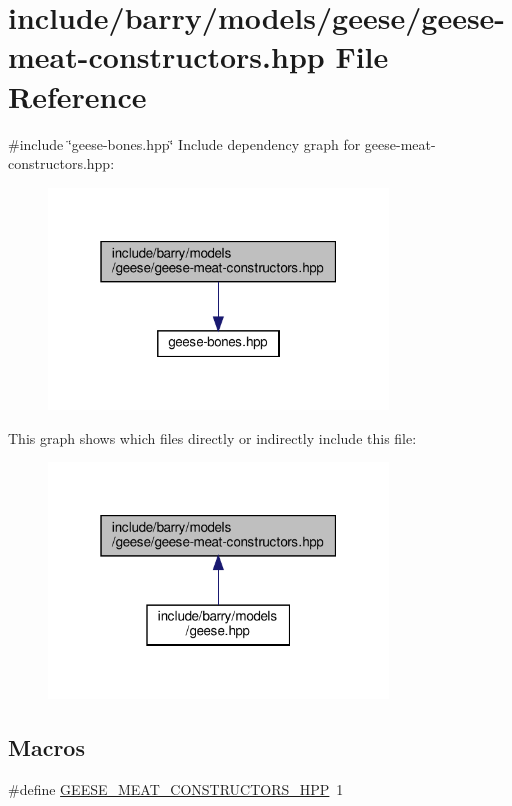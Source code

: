 \hypertarget{geese-meat-constructors_8hpp}{}\section{include/barry/models/geese/geese-\/meat-\/constructors.hpp File Reference}
\label{geese-meat-constructors_8hpp}
{\ttfamily \#include \char`\"{}geese-\/bones.\+hpp\char`\"{}}\newline
Include dependency graph for geese-\/meat-\/constructors.hpp\+:\nopagebreak
\begin{figure}[H]
\begin{center}
\leavevmode
\includegraphics[width=256pt]{geese-meat-constructors_8hpp__incl}
\end{center}
\end{figure}
This graph shows which files directly or indirectly include this file\+:\nopagebreak
\begin{figure}[H]
\begin{center}
\leavevmode
\includegraphics[width=256pt]{geese-meat-constructors_8hpp__dep__incl}
\end{center}
\end{figure}
\subsection*{Macros}
\begin{DoxyCompactItemize}
\item 
\#define \hyperlink{geese-meat-constructors_8hpp_a95bcd4c1ebfec95819701b9831eca55e}{G\+E\+E\+S\+E\+\_\+\+M\+E\+A\+T\+\_\+\+C\+O\+N\+S\+T\+R\+U\+C\+T\+O\+R\+S\+\_\+\+H\+PP}~1
\end{DoxyCompactItemize}


